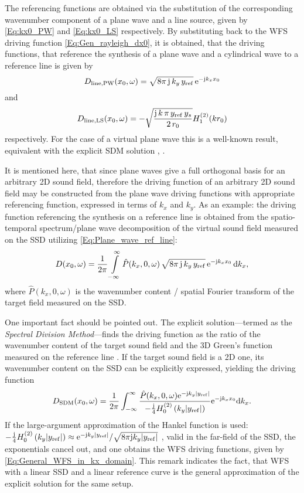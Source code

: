 The referencing functions are obtained via the substitution of the corresponding wavenumber component of a plane wave and a line source, given by \eqref{Eq:kx0_PW} and \eqref{Eq:kx0_LS} respectively.
By substituting back to the WFS driving function \eqref{Eq:Gen_rayleigh_dx0}, it is obtained, that the driving functions, that reference the synthesis of a plane wave and a cylindrical wave to a reference line is given by
\begin{equation}
\label{Eq:Plane_wave_ref_line}
D_\text{line,PW}(x_0,\omega) 
=\sqrt{8\pi\,\mathrm{j}\,k_y\,y_{\mathrm{ref}}}\,\mathrm{e}^{-\mathrm{j} k_x x_0 }
\end{equation}
and
\begin{equation}
D_\text{line,LS}(x_0,\omega) =- \sqrt{\frac{\mathrm{j}\,k\,\pi\,y_{\mathrm{ref}}\,y_s}{2\,r_0}}  H_1^{(2)}( k r_0 )
\end{equation}
respectively. 
For the case of a virtual plane wave this is a well-known result, equivalent with the explicit SDM solution \cite[(29)]{Ahrens2010a}, \cite{Ahrens2012}.

It is mentioned here, that since plane waves give a full orthogonal basis for an arbitrary 2D sound field, therefore 
the driving function of an arbitrary 2D sound field may be constructed from the plane wave driving functions with appropriate referencing function, expressed in terms of $k_x$ and $k_y$.  As an example: the driving function referencing the synthesis on a reference line is obtained from the spatio-temporal spectrum/plane wave decomposition of the virtual sound field measured on the SSD utilizing \eqref{Eq:Plane_wave_ref_line}:
\begin{equation}
D(x_0,\omega) = \frac{1}{2\pi} \int\limits_{-\infty}^{\infty} \hat{P}(k_x,0,\omega) \,\sqrt{8\pi\,\mathrm{j}\,k_y\,y_{\mathrm{ref}}} 
\,\mathrm{e}^{-\mathrm{j} k_x x_0}\,
 \mathrm{d} k_x,
	\label{Eq:General_WFS_in_kx_domain}
\end{equation}
where $\hat{P}(k_x,0,\omega)$ is the wavenumber content / spatial Fourier transform of the target field measured on the SSD.

 One important fact should be pointed out. The explicit solution---termed as the \emph{Spectral Division Method}---finds the driving function as the ratio of the wavenumber content of the target sound field and the 3D Green's function measured on the reference line \cite{Ahrens2010a}. 
 If the target sound field is a 2D one, its wavenumber content on the SSD can be explicitly expressed, yielding the driving function
%
 \begin{equation}
D_{\mathrm{SDM}}(x_0,\omega) = \frac{1}{2\pi} \int_{-\infty}^{\infty} \frac{ \hat{P}(k_x,0,\omega) \mathrm{e}^{-\mathrm{j} k_y |y_{\mathrm{ref}}|}}{
-\frac{\mathrm{j}}{4}H_0^{(2)}\left( k_y |y_{\mathrm{ref}}| \right) }
\mathrm{e}^{-\mathrm{j} k_x x_0 }
 \mathrm{d} k_x.
\end{equation}
If the large-argument approximation of the Hankel function is used: $-\frac{\mathrm{j}}{4}H_0^{(2)}\left( k_y |y_{\mathrm{ref}}| \right) \approx \mathrm{e}^{-\mathrm{j} k_y |y_{\mathrm{ref}}|}/\sqrt{8\pi\mathrm{j} k_y |y_{\mathrm{ref}}|}$ \cite{Williams1999}, valid in the far-field of the SSD, the exponentials cancel out, and one obtains the WFS driving functions, given by \eqref{Eq:General_WFS_in_kx_domain}. 
This remark indicates the fact, that WFS with a linear SSD and a linear reference curve is the general approximation of the explicit solution for the same setup.

